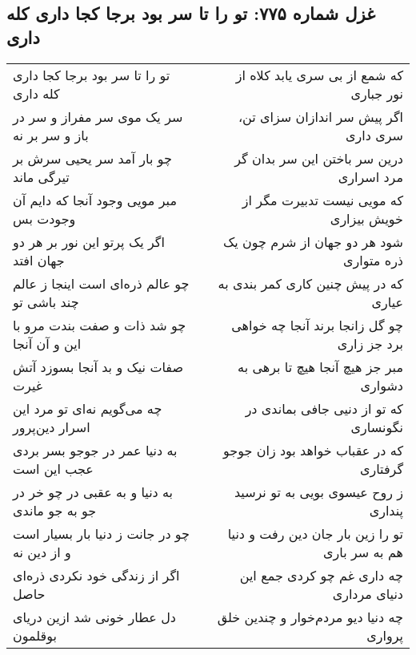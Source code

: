 \begin{center}
\section*{غزل شماره ۷۷۵: تو را تا سر بود برجا کجا داری کله داری}
\label{sec:775}
\begin{longtable}{l p{0.5cm} r}
تو را تا سر بود برجا کجا داری کله داری
&&
که شمع از بی سری یابد کلاه از نور جباری
\\
سر یک موی سر مفراز و سر در باز و سر بر نه
&&
اگر پیش سر اندازان سزای تن، سری داری
\\
چو بار آمد سر یحیی سرش بر تیرگی ماند
&&
درین سر باختن این سر بدان گر مرد اسراری
\\
مبر مویی وجود آنجا که دایم آن وجودت بس
&&
که مویی نیست تدبیرت مگر از خویش بیزاری
\\
اگر یک پرتو این نور بر هر دو جهان افتد
&&
شود هر دو جهان از شرم چون یک ذره متواری
\\
چو عالم ذره‌ای است اینجا ز عالم چند باشی تو
&&
که در پیش چنین کاری کمر بندی به عیاری
\\
چو شد ذات و صفت بندت مرو با این و آن آنجا
&&
چو گل زانجا برند آنجا چه خواهی برد جز زاری
\\
صفات نیک و بد آنجا بسوزد آتش غیرت
&&
مبر جز هیچ آنجا هیچ تا برهی به دشواری
\\
چه می‌گویم نه‌ای تو مرد این اسرار دین‌پرور
&&
که تو از دنیی جافی بماندی در نگونساری
\\
به دنیا عمر در جوجو بسر بردی عجب این است
&&
که در عقباب خواهد بود زان جوجو گرفتاری
\\
به دنیا و به عقبی در چو خر در جو به جو ماندی
&&
ز روح عیسوی بویی به تو نرسید پنداری
\\
چو در جانت ز دنیا بار بسیار است و از دین نه
&&
تو را زین بار جان دین رفت و دنیا هم به سر باری
\\
اگر از زندگی خود نکردی ذره‌ای حاصل
&&
چه داری غم چو کردی جمع این دنیای مرداری
\\
دل عطار خونی شد ازین دریای بوقلمون
&&
چه دنیا دیو مردم‌خوار و چندین خلق پرواری
\\
\end{longtable}
\end{center}
